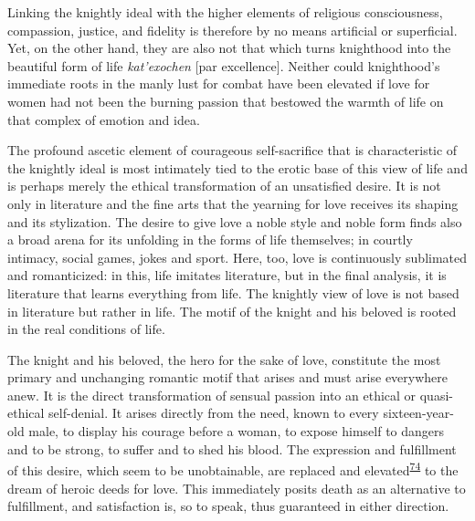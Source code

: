Linking the knightly ideal with the higher elements of religious
consciousness, compassion, justice, and fidelity is therefore by no
means artificial or superficial. Yet, on the other hand, they are also
not that which turns knighthood into the beautiful form of life
\emph{kat'exochen} {[}par excellence{]}. Neither could knighthood's
immediate roots in the manly lust for combat have been elevated if love
for women had not been the burning passion that bestowed the warmth of
life on that complex of emotion and idea.

The profound ascetic element of courageous self-sacrifice that is
characteristic of the knightly ideal is most intimately tied to the
erotic base of this view of life and is perhaps merely the ethical
transformation of an unsatisfied desire. It is not only in literature
and the fine arts that the yearning for love receives its shaping and
its stylization. The desire to give love a noble style and noble form
finds also a broad arena for its unfolding in the forms of life
themselves; in courtly intimacy, social games, jokes and sport. Here,
too, love is continuously sublimated and romanticized: in this, life
imitates literature, but in the final analysis, it is literature that
learns everything from life. The knightly view of love is not based in
\protect\hypertarget{10_Chapter_Three__THE_HEROIC_DREAM.xhtmlux5cux23page_83}{}{}literature
but rather in life. The motif of the knight and his beloved is rooted in
the real conditions of life.

The knight and his beloved, the hero for the sake of love, constitute
the most primary and unchanging romantic motif that arises and must
arise everywhere anew. It is the direct transformation of sensual
passion into an ethical or quasi-ethical self-denial. It arises directly
from the need, known to every sixteen-year-old male, to display his
courage before a woman, to expose himself to dangers and to be strong,
to suffer and to shed his blood. The expression and fulfillment of this
desire, which seem to be unobtainable, are replaced and
elevated\textsuperscript{\protect\hypertarget{10_Chapter_Three__THE_HEROIC_DREAM.xhtmlux5cux23id_1786}{\protect\hyperlink{23_NOTES.xhtmlux5cux23id_1787}{74}}}
to the dream of heroic deeds for love. This immediately posits death as
an alternative to fulfillment, and satisfaction is, so to speak, thus
guaranteed in either direction.


